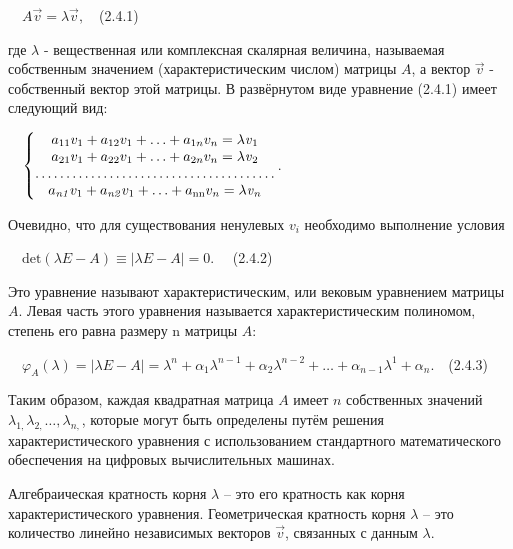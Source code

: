 		\ \  $A\vec v=\lambda \vec v,$\ \ (2.4.1)



		где  $\lambda $ - вещественная или комплексная скалярная величина, назы­ваемая собственным значением (характеристическим
		числом) матрицы  $A$, а вектор  $\vec v$ - собственный вектор этой матрицы. В развёрну­том виде уравнение (2.4.1) имеет
		следующий вид:



		\ \  $\left\{\begin{matrix}a_{11}v_1+a_{12}v_1+\ldots +a_{1n}v_n=\mathit{\lambda v}_1\\a_{21}v_1+a_{22}v_1+\ldots
		+a_{2n}v_n=\mathit{\lambda v}_2\\\ldots \ldots \ldots \ldots \ldots \ldots \ldots \ldots \ldots \ldots \ldots \ldots \ldots
		\\a_{\mathit{n1}}v_1+a_{\mathit{n2}}v_1+\ldots
		+a_{\normalsubformula{\text{nn}}}v_n=\mathit{\lambda v}_n\end{matrix}\right.$.\ \ 



		Очевидно, что для существования ненулевых  $v_i$ необходимо вы­пол­не­ние условия



		\ \  $\text{det}(\mathit{\lambda E}-A)\equiv |\mathit{\lambda E}-A|=0$. \ \ (2.4.2)



		Это уравнение называют характеристическим, или вековым уравнением матрицы  $A$. Левая часть этого уравнения называется
		характеристичес­ким полиномом, степень его равна размеру {n} матрицы  $A$:



		\ \  $\varphi _A(\lambda )=|\mathit{\lambda E}-A|=\lambda ^n+α_1\lambda ^{n-1}+α_2\lambda ^{n-2}+\ldots +α_{n-1}\lambda ^1+α_n$.\ \ (2.4.3)



		Таким образом, каждая квадратная матрица  $A$ имеет  $n$ собственных зна­чений  $\lambda _{1,}\lambda _{2,}\ldots ,\lambda _{n,}$, которые
		могут быть определены путём решения характеристического уравнения с использованием стандартного матема­тического
		обеспечения на цифровых вычислительных машинах.



\bigskip


		Алгебраическая кратность корня  $\lambda $ – это его кратность как корня характеристического уравнения. Геометрическая
		кратность корня  $\lambda $ – это количество линейно независимых векторов  $\vec v$, связанных с   данным  $\lambda $.


